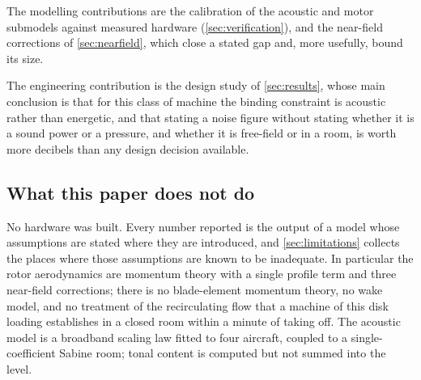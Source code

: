 The modelling contributions are the calibration of the acoustic and motor
submodels against measured hardware (\cref{sec:verification}), and the
near-field corrections of \cref{sec:nearfield}, which close a stated gap and,
more usefully, bound its size.

The engineering contribution is the design study of \cref{sec:results}, whose
main conclusion is that for this class of machine the binding constraint is
acoustic rather than energetic, and that stating a noise figure without stating
whether it is a sound power or a pressure, and whether it is free-field or in a
room, is worth more decibels than any design decision available.

\subsection{What this paper does not do}

No hardware was built. Every number reported is the output of a model whose
assumptions are stated where they are introduced, and \cref{sec:limitations}
collects the places where those assumptions are known to be inadequate. In
particular the rotor aerodynamics are momentum theory with a single profile
term and three near-field corrections; there is no blade-element momentum
theory, no wake model, and no treatment of the recirculating flow that a
machine of this disk loading establishes in a closed room within a minute of
taking off. The acoustic model is a broadband scaling law fitted to four
aircraft, coupled to a single-coefficient Sabine room; tonal content is
computed but not summed into the level.
